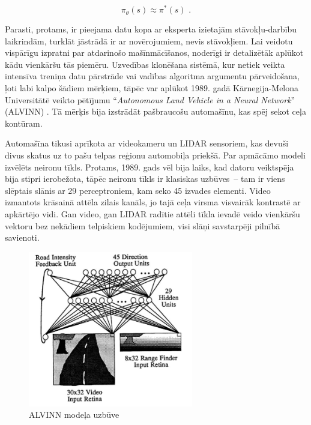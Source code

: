 \documentclass[12pt, a4paper]{article}
\numberwithin{equation}{section} %
\begin{document}
\begin{equation}
    \pi_{\theta}(s) \approx \pi^*(s)
\text{ .}
\end{equation}

Parasti, protams, ir pieejama datu kopa ar eksperta izietajām stāvokļu-darbību laikrindām, turklāt jāstrādā ir ar novērojumiem, nevis stāvokļiem. Lai veidotu vispārīgu izpratni par atdarinošo mašīnmācīšanos, noderīgi ir detalizētāk aplūkot kādu vienkāršu tās piemēru. Uzvedības klonēšana sistēmā, kur netiek veikta intensīva treniņa datu pārstrāde vai vadības algoritma argumentu pārveidošana, ļoti labi kalpo šādiem mērķiem, tāpēc var aplūkot 1989. gadā Kārnegija-Melona Universitātē veikto pētījumu ``\textit{Autonomous Land Vehicle in a Neural Network}'' (ALVINN) \cite{pomerleau1989alvinn}. Tā mērķis bija izstrādāt pašbraucošu automašīnu, kas spēj sekot ceļa kontūram.

Automašīna tikusi aprīkota ar videokameru un LIDAR sensoriem, kas devuši divus skatus uz to pašu telpas reģionu automobiļa priekšā. Par apmācāmo modeli izvēlēts neironu tīkls. Protams, 1989. gads vēl bija laiks, kad datoru veiktspēja bija stipri ierobežota, tāpēc neironu tīkls ir klasiskas uzbūves~-- tam ir viens slēptais slānis ar 29 perceptroniem, kam seko 45 izvades elementi. Video izmantots krāsainā attēla zilais kanāls, jo tajā ceļa virsma visvairāk kontrastē ar apkārtējo vidi. Gan video, gan LIDAR radītie attēli tīkla ievadē veido vienkāršu vektoru bez nekādiem telpiskiem kodējumiem, visi slāņi savstarpēji pilnībā savienoti.

\begin{figure}[t!]
    \centering
    \includegraphics[height=6.8cm,page=1]{../img/alvinn_architecture.png}
    \caption{ALVINN modeļa uzbūve \cite{pomerleau1989alvinn}}
\end{figure}
\end{document}
